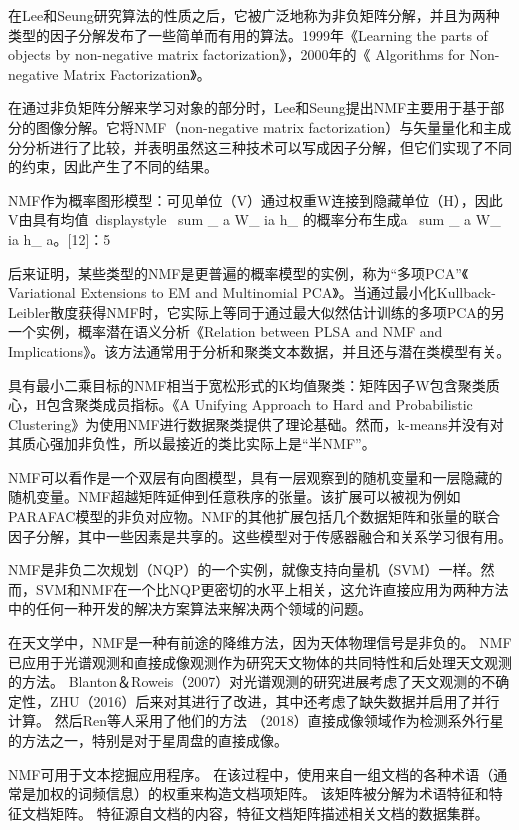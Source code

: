 \documentclass{ctexrep}
\begin{document}
在Lee和Seung研究算法的性质之后，它被广泛地称为非负矩阵分解，并且为两种类型的因子分解发布了一些简单而有用的算法。1999年《Learning the parts of objects by non-negative matrix factorization》，2000年的《 Algorithms for Non-negative Matrix Factorization》。

在通过非负矩阵分解来学习对象的部分时，Lee和Seung提出NMF主要用于基于部分的图像分解。它将NMF（non-negative matrix factorization）与矢量量化和主成分分析进行了比较，并表明虽然这三种技术可以写成因子分解，但它们实现了不同的约束，因此产生了不同的结果。

NMF作为概率图形模型：可见单位（V）通过权重W连接到隐藏单位（H），因此V由具有均值{\ displaystyle \ sum _ {a} W_ {ia} h_ {的概率分布生成a}} \ sum _ {a} W_ {ia} h_ {a}。[12]：5

后来证明，某些类型的NMF是更普遍的概率模型的实例，称为“多项PCA”《 Variational Extensions to EM and Multinomial PCA》。当通过最小化Kullback-Leibler散度获得NMF时，它实际上等同于通过最大似然估计训练的多项PCA的另一个实例，概率潜在语义分析《Relation between PLSA and NMF and Implications》。该方法通常用于分析和聚类文本数据，并且还与潜在类模型有关。

具有最小二乘目标的NMF相当于宽松形式的K均值聚类：矩阵因子W包含聚类质心，H包含聚类成员指标。《A Unifying Approach to Hard and Probabilistic Clustering》为使用NMF进行数据聚类提供了理论基础。然而，k-means并没有对其质心强加非负性，所以最接近的类比实际上是“半NMF”。

NMF可以看作是一个双层有向图模型，具有一层观察到的随机变量和一层隐藏的随机变量。NMF超越矩阵延伸到任意秩序的张量。该扩展可以被视为例如PARAFAC模型的非负对应物。NMF的其他扩展包括几个数据矩阵和张量的联合因子分解，其中一些因素是共享的。这些模型对于传感器融合和关系学习很有用。

NMF是非负二次规划（NQP）的一个实例，就像支持向量机（SVM）一样。然而，SVM和NMF在一个比NQP更密切的水平上相关，这允许直接应用为两种方法中的任何一种开发的解决方案算法来解决两个领域的问题。

在天文学中，NMF是一种有前途的降维方法，因为天体物理信号是非负的。 NMF已应用于光谱观测和直接成像观测作为研究天文物体的共同特性和后处理天文观测的方法。 Blanton＆Roweis（2007）对光谱观测的研究进展考虑了天文观测的不确定性，ZHU（2016）后来对其进行了改进，其中还考虑了缺失数据并启用了并行计算。 然后Ren等人采用了他们的方法 （2018）直接成像领域作为检测系外行星的方法之一，特别是对于星周盘的直接成像。

NMF可用于文本挖掘应用程序。 在该过程中，使用来自一组文档的各种术语（通常是加权的词频信息）的权重来构造文档项矩阵。 该矩阵被分解为术语特征和特征文档矩阵。 特征源自文档的内容，特征文档矩阵描述相关文档的数据集群。
\end{document}
